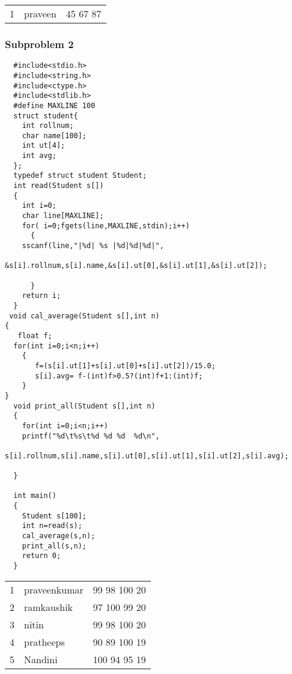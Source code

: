 \documentclass[11pt]{article}
\begin{document}
\begin{center}
\begin{tabular}{rll}
1 & praveen & 45 67 87\\
\end{tabular}
\end{center}

\subsubsection{Subproblem 2}
\label{sec-1-1-2}
\begin{verbatim}
  #include<stdio.h>
  #include<string.h>
  #include<ctype.h>
  #include<stdlib.h>
  #define MAXLINE 100
  struct student{
    int rollnum;
    char name[100];
    int ut[4];
    int avg; 
  };
  typedef struct student Student;
  int read(Student s[])
  {
    int i=0;
    char line[MAXLINE];
    for( i=0;fgets(line,MAXLINE,stdin);i++)
      {
	sscanf(line,"|%d| %s |%d|%d|%d|",
	       &s[i].rollnum,s[i].name,&s[i].ut[0],&s[i].ut[1],&s[i].ut[2]);

      }
    return i;
  }
 void cal_average(Student s[],int n)
{
   float f;
  for(int i=0;i<n;i++)
    {
       f=(s[i].ut[1]+s[i].ut[0]+s[i].ut[2])/15.0;
       s[i].avg= f-(int)f>0.5?(int)f+1:(int)f;
    }
}
  void print_all(Student s[],int n)
  {
    for(int i=0;i<n;i++)
	printf("%d\t%s\t%d %d %d  %d\n",
		s[i].rollnum,s[i].name,s[i].ut[0],s[i].ut[1],s[i].ut[2],s[i].avg);

  }

  int main()
  {
    Student s[100];
    int n=read(s);
    cal_average(s,n);
    print_all(s,n); 
    return 0;
  }
\end{verbatim}

\begin{center}
\begin{tabular}{rll}
1 & praveenkumar & 99 98 100  20\\
2 & ramkaushik & 97 100 99  20\\
3 & nitin & 99 98 100  20\\
4 & pratheeps & 90 89 100  19\\
5 & Nandini & 100 94 95  19\\
\end{tabular}
\end{center}
\end{document}
